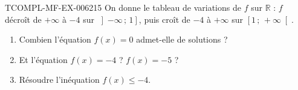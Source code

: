 \begin{exercice}{TCOMPL-MF-EX-006}{2}{15}
On donne le tableau de variations de $f$ sur $\mathbb{R}$ : $f$ décroît de
$+\infty$ à $-4$ sur $\left]-\infty\,;\,1\right]$, puis croît de $-4$ à
$+\infty$ sur $\left[1\,;\,+\infty\right[$.
\begin{enumerate}
  \item Combien l'équation $f(x)=0$ admet-elle de solutions ?
  \item Et l'équation $f(x)=-4$ ? $f(x)=-5$ ?
  \item Résoudre l'inéquation $f(x)\leq-4$.
\end{enumerate}
\end{exercice}
